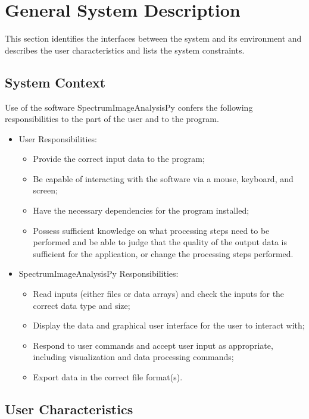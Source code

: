 \documentclass[12pt]{article}
\newcommand{\progname}{SpectrumImageAnalysisPy} %
\begin{document}
\section{General System Description}

This section identifies the interfaces between the system and its environment and
describes the user characteristics and lists the system constraints.

\subsection{System Context}

Use of the software \progname{} confers the following responsibilities to the part of the user and to the program.

\begin{itemize}
	\item User Responsibilities:
	\begin{itemize}
		\item Provide the correct input data to the program;
		\item Be capable of interacting with the software via a mouse, keyboard, and screen;
		\item Have the necessary dependencies for the program installed;
		\item Possess sufficient knowledge on what processing steps need to be performed and be able to judge that the quality of the output data is sufficient for the application, or change the processing steps performed.
	\end{itemize}
	\item \progname{} Responsibilities:
	\begin{itemize}
		\item Read inputs (either files or data arrays) and check the inputs for the correct data type and size;
		\item Display the data and graphical user interface for the user to interact with;
		\item Respond to user commands and accept user input as appropriate, including visualization and data processing commands;
		\item Export data in the correct file format(s).
	\end{itemize}
\end{itemize}

\subsection{User Characteristics} \label{SecUserCharacteristics}
\end{document}
